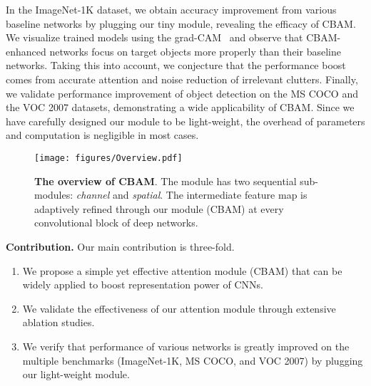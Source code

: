 \documentclass[runningheads]{llncs}
\newcommand{\figref}[1]{Fig.~\ref{#1}}
\newcommand*{\modulenameabb}{CBAM}
\begin{document}
In the ImageNet-1K dataset, we obtain accuracy improvement from various baseline networks by plugging our tiny module, revealing the efficacy of \modulenameabb. 
We visualize trained models using the grad-CAM~\cite{selvaraju2017grad} and observe that \modulenameabb-enhanced networks focus on target objects more properly than their baseline networks.
Taking this into account, we conjecture that the performance boost comes from accurate attention and noise reduction of irrelevant clutters. Finally, we validate performance improvement of object detection on the MS COCO and the VOC 2007 datasets, demonstrating a wide applicability of \modulenameabb. Since we have carefully designed our module to be light-weight, the overhead of parameters and computation is negligible in most cases.

\begin{figure}[t]
  \centering
  \texttt{[image: figures/Overview.pdf]}
  \caption{\textbf{The overview of CBAM}. The module has two sequential sub-modules: \textit{channel} and \textit{spatial}. The intermediate feature map is adaptively refined through our module (CBAM) at every convolutional block of deep networks.}
  \label{fig:overall}
  \vspace{-6mm}
\end{figure}

\smallskip\noindent\textbf{Contribution.} Our main contribution is three-fold.
\begin{enumerate}[topsep=0pt,itemsep=0pt]
\item We propose a simple yet effective attention module (\modulenameabb) that can be widely applied to boost representation power of CNNs.
\item We validate the effectiveness of our attention module through extensive ablation studies.
\item We verify that performance of various networks is greatly improved on the multiple benchmarks (ImageNet-1K, MS COCO, and VOC 2007) by plugging our light-weight module.
\end{enumerate}
\end{document}
